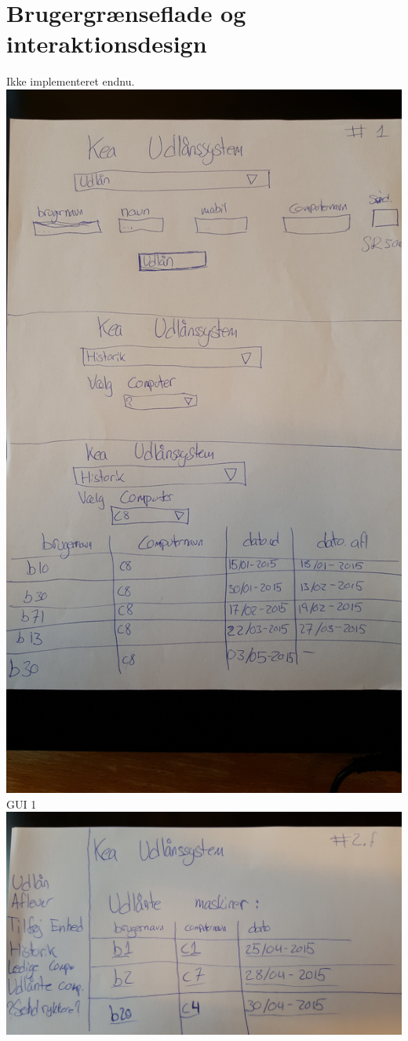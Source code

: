 \documentclass[a4paper]{article}
\begin{document}
\section{Brugergrænseflade og interaktionsdesign}
Ikke implementeret endnu.\\
\includegraphics[scale=0.07]{1.jpg}\\
GUI 1\\
\includegraphics[scale=0.07]{4.jpg}\\
\end{document}
